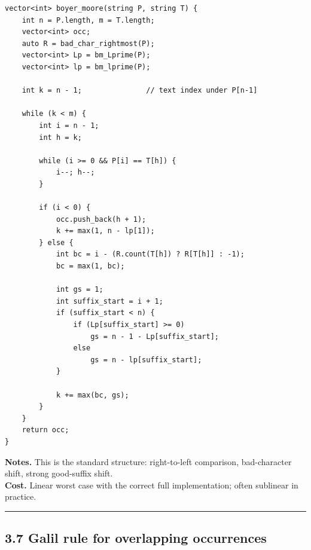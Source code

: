 \documentclass[11pt]{article}
\begin{document}
\begin{verbatim}
vector<int> boyer_moore(string P, string T) {
    int n = P.length, m = T.length;
    vector<int> occ;
    auto R = bad_char_rightmost(P);
    vector<int> Lp = bm_Lprime(P);
    vector<int> lp = bm_lprime(P);

    int k = n - 1;               // text index under P[n-1]

    while (k < m) {
        int i = n - 1;
        int h = k;

        while (i >= 0 && P[i] == T[h]) {
            i--; h--;
        }

        if (i < 0) {
            occ.push_back(h + 1);
            k += max(1, n - lp[1]);
        } else {
            int bc = i - (R.count(T[h]) ? R[T[h]] : -1);
            bc = max(1, bc);

            int gs = 1;
            int suffix_start = i + 1;
            if (suffix_start < n) {
                if (Lp[suffix_start] >= 0)
                    gs = n - 1 - Lp[suffix_start];
                else
                    gs = n - lp[suffix_start];
            }

            k += max(bc, gs);
        }
    }
    return occ;
}
\end{verbatim}

\textbf{Notes.} This is the standard structure: right-to-left comparison, bad-character shift, strong good-suffix shift.\\
\textbf{Cost.} Linear worst case with the correct full implementation; often sublinear in practice.

\begin{center}\rule{0.5\linewidth}{0.5pt}\end{center}

\subsection{3.7 Galil rule for overlapping occurrences}\label{galil-rule-for-overlapping-occurrences}
\end{document}
